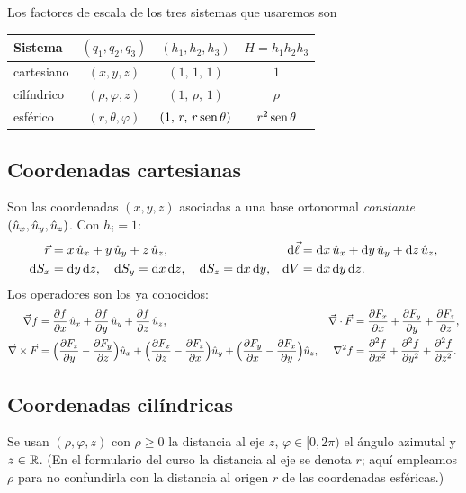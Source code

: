 Los factores de escala de los tres sistemas que usaremos son
\begin{center}
\renewcommand{\arraystretch}{1.3}
\begin{tabular}{@{}lccc@{}}
\toprule
Sistema & $(q_1,q_2,q_3)$ & $(h_1,h_2,h_3)$ & $H=h_1h_2h_3$\\
\midrule
cartesiano & $(x,y,z)$ & $(1,\,1,\,1)$ & $1$\\
cilíndrico & $(\rho,\varphi,z)$ & $(1,\,\rho,\,1)$ & $\rho$\\
esférico & $(r,\theta,\varphi)$ & $(1,\,r,\,r\operatorname{sen}\theta)$ & $r^{2}\operatorname{sen}\theta$\\
\bottomrule
\end{tabular}
\end{center}

\subsection{Coordenadas cartesianas}\label{sec:cartesianas}

Son las coordenadas $(x,y,z)$ asociadas a una base ortonormal \emph{constante}
$(\hat{u}_{x},\hat{u}_{y},\hat{u}_{z})$. Con $h_i=1$:
\begin{align}
  \vec{r}&=x\,\hat{u}_{x}+y\,\hat{u}_{y}+z\,\hat{u}_{z}, & \mathrm{d}\vec{\ell}&=\mathrm{d} x\,\hat{u}_{x}+\mathrm{d} y\,\hat{u}_{y}+\mathrm{d} z\,\hat{u}_{z},\nonumber\\
  \mathrm{d} S_x&=\mathrm{d} y\,\mathrm{d} z,\quad\mathrm{d} S_y=\mathrm{d} x\,\mathrm{d} z,\quad\mathrm{d} S_z=\mathrm{d} x\,\mathrm{d} y, & \mathrm{d} V&=\mathrm{d} x\,\mathrm{d} y\,\mathrm{d} z.\nonumber
\end{align}
Los operadores son los ya conocidos:
\begin{align}
  \vec{\nabla} f&=\frac{\partial f}{\partial x}\,\hat{u}_{x}+\frac{\partial f}{\partial y}\,\hat{u}_{y}+\frac{\partial f}{\partial z}\,\hat{u}_{z}, &
  \vec{\nabla}\cdot\vec{F}&=\frac{\partial F_x}{\partial x}+\frac{\partial F_y}{\partial y}+\frac{\partial F_z}{\partial z},\nonumber\\
  \vec{\nabla}\times\vec{F}&=\Bigl(\frac{\partial F_z}{\partial y}-\frac{\partial F_y}{\partial z}\Bigr)\hat{u}_{x}+\Bigl(\frac{\partial F_x}{\partial z}-\frac{\partial F_z}{\partial x}\Bigr)\hat{u}_{y}+\Bigl(\frac{\partial F_y}{\partial x}-\frac{\partial F_x}{\partial y}\Bigr)\hat{u}_{z}, &
  \nabla^{2} f&=\frac{\partial^{2} f}{\partial x^{2}}+\frac{\partial^{2} f}{\partial y^{2}}+\frac{\partial^{2} f}{\partial z^{2}}.\nonumber
\end{align}

\subsection{Coordenadas cilíndricas}\label{sec:cilindricas}
Se usan $(\rho,\varphi,z)$ con $\rho\ge0$ la distancia al eje $z$,
$\varphi\in[0,2\pi)$ el ángulo azimutal y $z\in\mathbb{R}$. (En el formulario del curso
la distancia al eje se denota $r$; aquí empleamos $\rho$ para no confundirla con
la distancia al origen $r$ de las coordenadas esféricas.)

